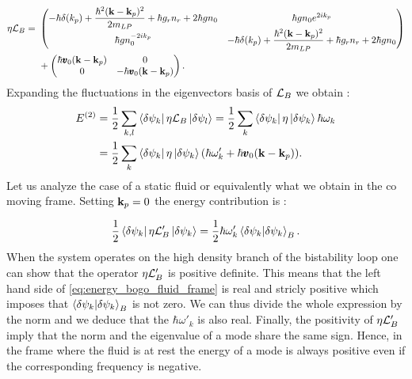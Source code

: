 \begin{equation}
    \begin{aligned}
    \eta\mathcal{L}_B = \ &
    \begin{pmatrix}
        -\hbar\delta(k_p)+\dfrac{\hbar^2(\mathbf{k}-\mathbf{k}_p)^2}{2m_{LP}}+\hbar g_rn_r + 2\hbar g n_0 &  \hbar g n_0e^{2ik_p} \\
        \hbar g n_0^{-2ik_p} & -\hbar\delta(k_p)+\dfrac{\hbar^2(\mathbf{k}-\mathbf{k}_p)^2}{2m_{LP}}+\hbar g_rn_r + 2\hbar g n_0
    \end{pmatrix}\\
    &+\begin{pmatrix}
        \hbar \pmb{v}_0(\mathbf{k}-\mathbf{k}_p) & 0 \\
        0 & -\hbar \pmb{v}_0(\mathbf{k}-\mathbf{k}_p)
    \end{pmatrix}.
    \end{aligned}
\end{equation}
Expanding the fluctuations in the eigenvectors basis of $\mathcal{L}_B$ we obtain :
\begin{equation}
    \begin{aligned}
    E^{(2)} &= \dfrac{1}{2}\sum_{k,l}\bra{\delta\psi_k}\eta\mathcal{L}_B\ket{\delta\psi_l}=\dfrac{1}{2}\sum_k\bra{\delta\psi_k}\eta\ket{\delta\psi_k}\hbar\omega_k \\
    &=\dfrac{1}{2}\sum_k\bra{\delta\psi_k}\eta\ket{\delta\psi_k}(\hbar\omega'_k+\hbar \pmb{v}_0(\mathbf{k}-\mathbf{k}_p)).
    \end{aligned}
    \label{eq:energy_bogo_lab_frame}
\end{equation}
Let us analyze the case of a static fluid or equivalently what we obtain in the co moving frame. Setting $\mathbf{k}_p=0$ the energy contribution is :

\begin{equation}
    \dfrac{1}{2}\bra{\delta\psi_k}\eta\mathcal{L}_B'\ket{\delta\psi_k} =\dfrac{1}{2}\hbar\omega'_k\bra{\delta\psi_k}\ket{\delta\psi_k}_B.
    \label{eq:energy_bogo_fluid_frame}
\end{equation}
When the system operates on the high density branch of the bistability loop one can show that the operator $\eta\mathcal{L}_B'$ is positive definite.
This means that the left hand side of \autoref{eq:energy_bogo_fluid_frame} is real and stricly positive which imposes 
that $\bra{\delta\psi_k}\ket{\delta\psi_k}_B$ is not zero. We can thus divide the whole expression by the norm and we deduce that the $\hbar\omega'_k$ is also real.
Finally, the positivity of $\eta\mathcal{L}_B'$ imply that the norm and the eigenvalue of a mode share the same sign. Hence,
in the frame where the fluid is at rest the energy of a mode is always positive even if the corresponding frequency is negative.

